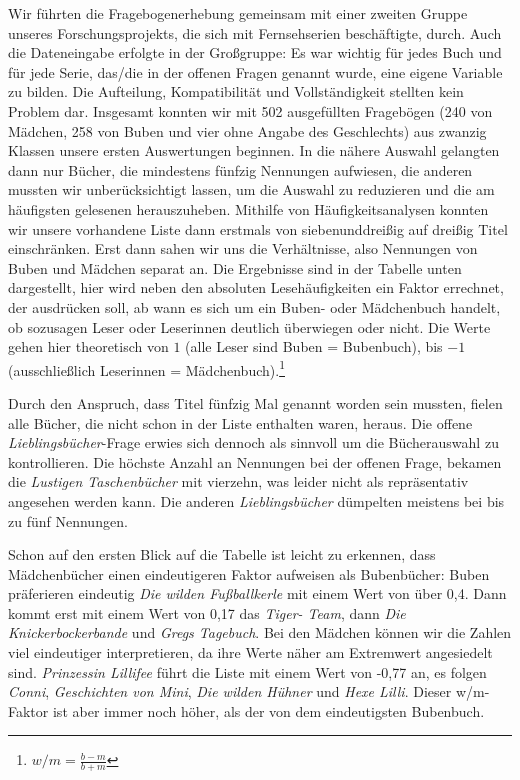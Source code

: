 Wir führten die Fragebogenerhebung gemeinsam mit einer zweiten Gruppe
unseres Forschungsprojekts, die sich mit Fernsehserien beschäftigte,
durch. Auch die Dateneingabe erfolgte in der Großgruppe: Es war wichtig
für jedes Buch und für jede Serie, das/die in der offenen Fragen genannt
wurde, eine eigene Variable zu bilden. Die Aufteilung, Kompatibilität
und Vollständigkeit stellten kein Problem dar. Insgesamt konnten wir mit
502 ausgefüllten Fragebögen (240 von Mädchen, 258 von Buben und vier
ohne Angabe des Geschlechts) aus zwanzig Klassen unsere ersten
Auswertungen beginnen. In die nähere Auswahl gelangten dann nur Bücher,
die mindestens fünfzig Nennungen aufwiesen, die anderen mussten wir
unberücksichtigt lassen, um die Auswahl zu reduzieren und die am
häufigsten gelesenen herauszuheben. Mithilfe von Häufigkeitsanalysen
konnten wir unsere vorhandene Liste dann erstmals von siebenunddreißig
auf dreißig Titel einschränken. Erst dann sahen wir uns die
Verhältnisse, also Nennungen von Buben und Mädchen separat an. Die
Ergebnisse sind in der Tabelle unten dargestellt, hier wird neben den
absoluten Lesehäufigkeiten ein Faktor errechnet, der ausdrücken soll, ab
wann es sich um ein Buben- oder Mädchenbuch handelt, ob sozusagen Leser
oder Leserinnen deutlich überwiegen oder nicht. Die Werte gehen hier
theoretisch von $1$ (alle Leser sind Buben = Bubenbuch), bis $-1$
(ausschließlich Leserinnen =
Mädchenbuch).\footnote{$w/m=\frac{b-m}{b+m}$}



Durch den Anspruch, dass Titel fünfzig Mal genannt worden sein mussten,
fielen alle Bücher, die nicht schon in der Liste enthalten waren,
heraus. Die offene \emph{Lieblingsbücher}-Frage erwies sich dennoch als
sinnvoll um die Bücherauswahl zu kontrollieren. Die höchste Anzahl an
Nennungen bei der offenen Frage, bekamen die \emph{Lustigen
Taschenbücher} mit vierzehn, was leider nicht als repräsentativ
angesehen werden kann. Die anderen \emph{Lieblingsbücher} dümpelten
meistens bei bis zu fünf Nennungen.

Schon auf den ersten Blick auf die Tabelle ist leicht zu erkennen, dass
Mädchenbücher einen eindeutigeren Faktor aufweisen als Bubenbücher:
Buben präferieren eindeutig \emph{Die wilden Fußballkerle} mit einem
Wert von über 0,4. Dann kommt erst mit einem Wert von 0,17 das
\emph{Tiger- Team}, dann \emph{Die Knickerbockerbande} und \emph{Gregs
Tagebuch}. Bei den Mädchen können wir die Zahlen viel eindeutiger
interpretieren, da ihre Werte näher am Extremwert angesiedelt sind.
\emph{Prinzessin Lillifee} führt die Liste mit einem Wert von -0,77 an,
es folgen \emph{Conni}, \emph{Geschichten von Mini}, \emph{Die wilden
Hühner} und \emph{Hexe Lilli}. Dieser w/m- Faktor ist aber immer noch
höher, als der von dem eindeutigsten Bubenbuch.

